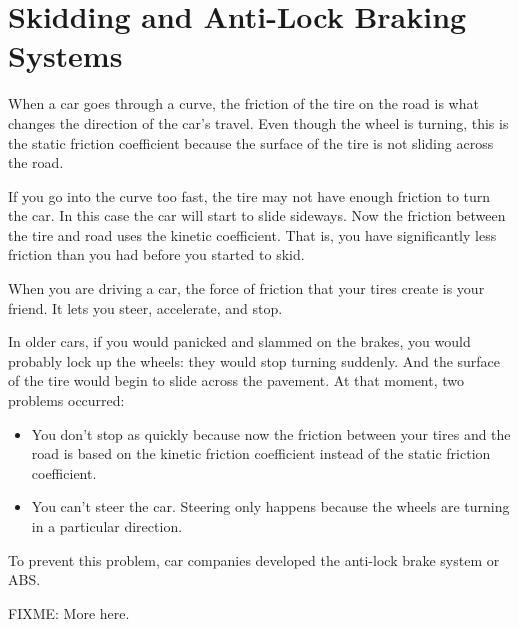 \section{Skidding and Anti-Lock Braking Systems}

When a car goes through a curve,  the friction of the tire on the road is what changes the direction of the 
car's travel.  Even though the wheel is turning,   this is the static friction coefficient because the surface of the tire is not sliding across the road.

If you go into the curve too fast,  the tire may not have enough friction to turn the car.  In this case the car will start to slide sideways.  Now the friction between the tire and road uses the kinetic coefficient.  That is,   you have significantly less friction than you had before you started to skid.

When you are driving a car,  the force of friction that your tires create is your friend.  It lets you steer, accelerate, and stop.

In older cars,  if you would panicked  and slammed on the brakes,  you would probably lock up the wheels: they would stop turning suddenly.  And the surface of the tire would begin to slide across the pavement.  At that moment,  two problems occurred:
\begin{itemize}
\item You don't stop as quickly because now the friction between your tires and the road is based on the kinetic friction coefficient instead of the static friction coefficient.
\item You can't steer the car.  Steering only happens because the wheels are turning in a particular direction.
\end{itemize}

To prevent this problem,  car companies developed the anti-lock brake system or ABS.

FIXME: More here.

